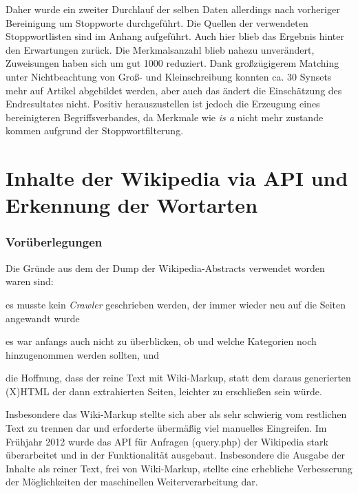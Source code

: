 \documentclass[pagesize,DIV=calc,12pt,final]{scrreprt}
\begin{document}
Daher wurde ein zweiter Durchlauf der selben Daten allerdings nach vorheriger Bereinigung um Stoppworte durchgeführt. 
Die Quellen der verwendeten Stoppwortlisten sind im Anhang aufgeführt. 
Auch hier blieb das Ergebnis hinter den Erwartungen zurück. 
Die Merkmalsanzahl blieb nahezu unverändert, Zuweisungen haben sich um gut 1000 reduziert. 
Dank großzügigerem Matching unter Nichtbeachtung von Groß- und Kleinschreibung konnten ca. 30 Synsets mehr auf Artikel abgebildet werden, aber auch das ändert die Einschätzung des Endresultates nicht. 
Positiv herauszustellen ist jedoch die Erzeugung eines bereinigteren Begriffsverbandes, da Merkmale wie \emph{is a} nicht mehr zustande kommen aufgrund der Stoppwortfilterung. 

\section{Inhalte der Wikipedia via API und Erkennung der Wortarten}

\subsubsection{Vorüberlegungen}

Die Gründe aus dem der Dump der Wikipedia-Abstracts verwendet worden waren sind: 
\begin{inparaenum}
\item es musste kein \emph{Crawler} geschrieben werden, der immer wieder neu auf die Seiten angewandt wurde
\item es war anfangs auch nicht zu überblicken, ob und welche Kategorien noch hinzugenommen werden sollten, und 
\item die Hoffnung, dass der reine Text mit Wiki-Markup, statt dem daraus generierten (X)HTML der dann extrahierten Seiten, leichter zu erschließen sein würde.
\end{inparaenum}

Insbesondere das Wiki-Markup stellte sich aber als sehr schwierig vom restlichen Text zu trennen dar und erforderte übermäßig viel manuelles Eingreifen. 
Im Frühjahr 2012 wurde das API für Anfragen (query.php) der Wikipedia stark überarbeitet und in der Funktionalität ausgebaut. 
Insbesondere die Ausgabe der Inhalte als reiner Text, frei von Wiki-Markup, stellte eine erhebliche Verbesserung der Möglichkeiten der maschinellen Weiterverarbeitung dar. 
\end{document}
